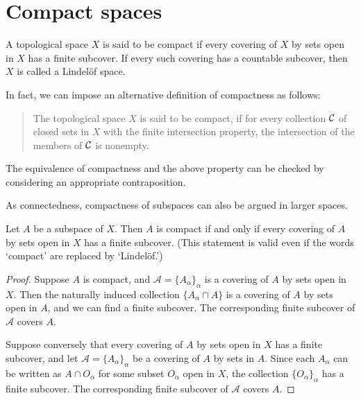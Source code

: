 \section{Compact spaces}

\begin{defi}
    A topological space $X$ is said to be compact if every covering of $X$ by sets open in $X$ has a finite subcover.
    If every such covering has a countable subcover, then $X$ is called a Lindel\"{o}f space.
\end{defi}
\begin{rmk}
    In fact, we can impose an alternative definition of compactness as follows:
    \begin{quotation}
        The topological space $X$ is said to be compact, if for every collection ${\mathcal{C}}$ of closed sets in $X$ with the finite intersection property, the intersection of the members of ${\mathcal{C}}$ is nonempty. 
    \end{quotation}
    The equivalence of compactness and the above property can be checked by considering an appropriate contraposition.
\end{rmk}

As connectedness, compactness of subspaces can also be argued in larger spaces.
\begin{thm}
    Let $A$ be a subspace of $X$.
    Then $A$ is compact if and only if every covering of $A$ by sets open in $X$ has a finite subcover.
    (This statement is valid even if the words `compact' are replaced by `Lindel\"{o}f.')
\end{thm}
\begin{proof}
    Suppose $A$ is compact, and $\mathcal{A}=\{A_\alpha\}_\alpha$ is a covering of $A$ by sets open in $X$.
    Then the naturally induced collection $\{A_\alpha\cap A\}$ is a covering of $A$ by sets open in $A$, and we can find a finite subcover.
    The corresponding finite subcover of $\mathcal{A}$ covers $A$.

    Suppose conversely that every covering of $A$ by sets open in $X$ has a finite subcover, and let $\mathcal{A}=\{A_\alpha\}_\alpha$ be a covering of $A$ by sets in $A$.
    Since each $A_\alpha$ can be written as $A\cap O_\alpha$ for some subset $O_\alpha$ open in $X$, the collection $\{O_\alpha\}_\alpha$ has a finite subcover.
    The corresponding finite subcover of $\mathcal{A}$ covers $A$.
\end{proof}

